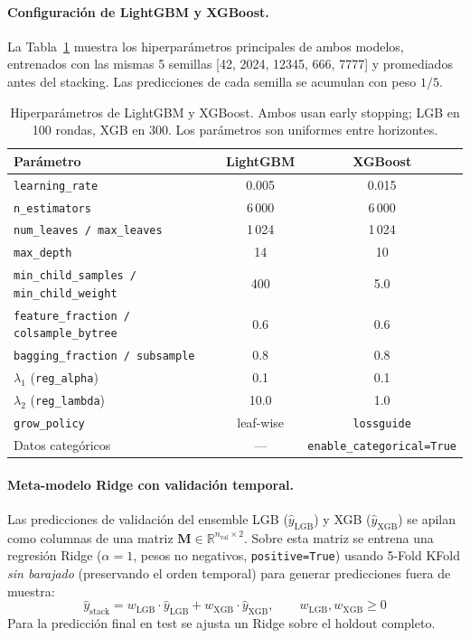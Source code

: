 \documentclass{article}
\begin{document}
\paragraph{Configuración de LightGBM y XGBoost.}
La Tabla~\ref{tab:lgb_xgb_cfg} muestra los hiperparámetros principales de ambos modelos, entrenados con las mismas 5 semillas [42, 2024, 12345, 666, 7777] y promediados antes del stacking. Las predicciones de cada semilla se acumulan con peso $1/5$.

\begin{table}[h!]
  \caption{Hiperparámetros de LightGBM y XGBoost. Ambos usan early stopping; LGB en 100 rondas, XGB en 300. Los parámetros son uniformes entre horizontes.}
  \label{tab:lgb_xgb_cfg}
  \centering
  \begin{tabular}{lcc}
    \toprule
    Parámetro & LightGBM & XGBoost \\
    \midrule
    \texttt{learning\_rate}      & 0.005 & 0.015 \\
    \texttt{n\_estimators}       & 6\,000 & 6\,000 \\
    \texttt{num\_leaves / max\_leaves} & 1\,024 & 1\,024 \\
    \texttt{max\_depth}          & 14 & 10 \\
    \texttt{min\_child\_samples / min\_child\_weight} & 400 & 5.0 \\
    \texttt{feature\_fraction / colsample\_bytree} & 0.6 & 0.6 \\
    \texttt{bagging\_fraction / subsample} & 0.8 & 0.8 \\
    $\lambda_1$ (\texttt{reg\_alpha})   & 0.1 & 0.1 \\
    $\lambda_2$ (\texttt{reg\_lambda})  & 10.0 & 1.0 \\
    \texttt{grow\_policy}        & leaf-wise & \texttt{lossguide} \\
    Datos categóricos            & --- & \texttt{enable\_categorical=True} \\
    \bottomrule
  \end{tabular}
\end{table}

\paragraph{Meta-modelo Ridge con validación temporal.}
Las predicciones de validación del ensemble LGB ($\hat{y}_{\text{LGB}}$) y XGB ($\hat{y}_{\text{XGB}}$) se apilan como columnas de una matriz $\mathbf{M} \in \mathbb{R}^{n_{\text{val}} \times 2}$. Sobre esta matriz se entrena una regresión Ridge ($\alpha = 1$, pesos no negativos, \texttt{positive=True}) usando 5-Fold KFold \emph{sin barajado} (preservando el orden temporal) para generar predicciones fuera de muestra:
\begin{equation}
  \hat{y}_{\text{stack}} = w_{\text{LGB}} \cdot \hat{y}_{\text{LGB}} + w_{\text{XGB}} \cdot \hat{y}_{\text{XGB}}, \qquad w_{\text{LGB}}, w_{\text{XGB}} \geq 0
  \label{eq:ridge_stack}
\end{equation}
Para la predicción final en test se ajusta un Ridge sobre el holdout completo.
\end{document}
